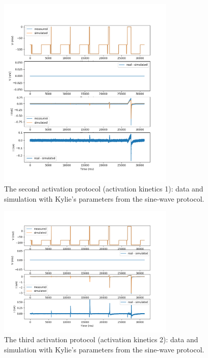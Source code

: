 \documentclass[preprint,authoryear,10pt]{elsarticle}
\begin{document}
\begin{figure}[H]
\centerline{
\includegraphics[width=0.75\textwidth]{fig/activation-2-data-and-sim}
}
\caption{%
The second activation protocol (activation kinetics 1): data and simulation
with Kylie's parameters from the sine-wave protocol.
}
\label{fig:activation-kinetics-1}
\end{figure}

\begin{figure}[H]
\centerline{
\includegraphics[width=0.75\textwidth]{fig/activation-3-data-and-sim}
}
\caption{%
The third activation protocol (activation kinetics 2): data and simulation
with Kylie's parameters from the sine-wave protocol.
}
\label{fig:activation-kinetics-2}
\end{figure}
\end{document}
